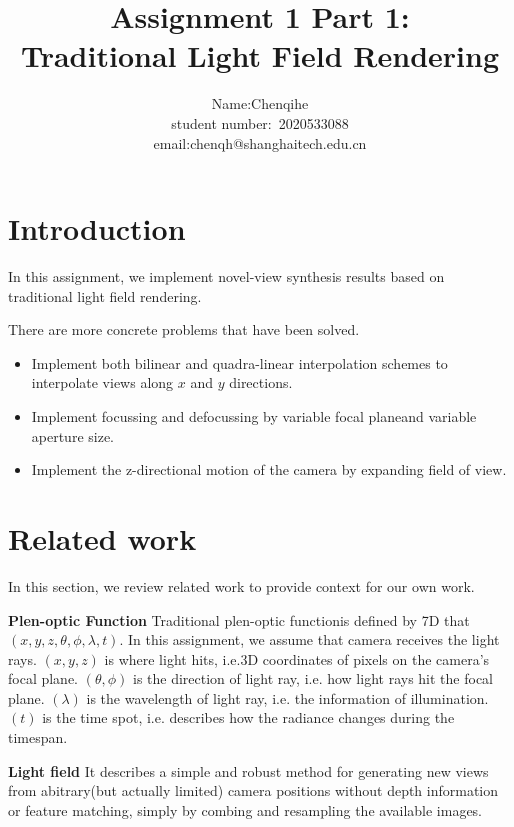 \documentclass[acmtog]{acmart}
\title{Assignment 1 Part 1:\\ {Traditional Light Field Rendering}}
\author{Name:\quad Chenqihe  \\ student number:\ 2020533088
\\email:\quad chenqh@shanghaitech.edu.cn}
\begin{document}
\maketitle

\vspace*{2 ex}

\section{Introduction}
	\quad In this assignment, we implement novel-view synthesis results based on traditional light field rendering. 
	
	\quad There are more concrete problems that have been solved. 
	
	\begin{itemize}
		\item Implement both bilinear and quadra-linear interpolation schemes to interpolate views along $x$ and $y$ directions.
		
		\item Implement focussing and defocussing by variable focal planeand variable aperture size.
		
		\item Implement the z-directional motion of the camera by expanding field of view.
		
	\end{itemize}
	
\section{Related work}
\quad In this section, we review related work to provide context for our own work.

\textbf{Plen-optic Function} Traditional plen-optic functionis defined by 7D that $(x, y, z, \theta, \phi, \lambda, t)$. In this assignment, we assume that camera receives the light rays. $(x, y, z)$ is where light hits, i.e.3D coordinates of pixels on the camera's focal plane. $(\theta, \phi)$ is the direction of light ray, i.e. how light rays hit the focal plane. $(\lambda)$ is the wavelength of light ray, i.e. the information of illumination. $(t)$ is the time spot, i.e. describes how the radiance changes during the timespan.

\textbf{Light field} It describes a simple and robust method for generating new views from abitrary(but actually limited) camera positions without depth information or feature matching, simply by combing and resampling the available images.
\end{document}
